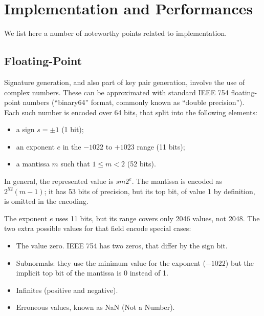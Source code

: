 
\chapter{Implementation and Performances}\label{chap:impl}

We list here a number of noteworthy points related to implementation.

\section{Floating-Point}

Signature generation, and also part of key pair generation, involve the
use of complex numbers. These can be approximated with standard IEEE 754
floating-point numbers (``binary64'' format, commonly known as ``double
precision''). Each such number is encoded over 64 bits, that split into
the following elements:
\begin{itemize}
  \item a sign $s = \pm 1$ (1 bit);
  \item an exponent $e$ in the $-1022$ to $+1023$ range (11 bits);
  \item a mantissa $m$ such that $1\le m< 2$ (52 bits).
\end{itemize}
In general, the represented value is $sm2^e$. The mantissa is encoded as
$2^{52}(m-1)$; it has 53 bits of precision, but its top bit, of value 1
by definition, is omitted in the encoding.

The exponent $e$ uses 11 bits, but its range covers only 2046 values, not
2048. The two extra possible values for that field encode special cases:
\begin{itemize}
  \item The value zero. IEEE 754 has two zeros, that differ by the sign
  bit.
  \item Subnormals: they use the minimum value for the exponent ($-1022$)
  but the implicit top bit of the mantissa is 0 instead of 1.
  \item Infinites (positive and negative).
  \item Erroneous values, known as NaN (Not a Number).
\end{itemize}

